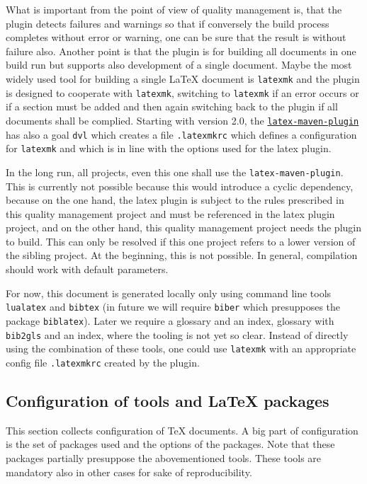 \documentclass[a4paper,12pt]{article}
\begin{document}
What is important from the point of view of quality management is, 
that the plugin detects failures and warnings so 
that if conversely the build process completes without error or warning, 
one can be sure that the result is without failure also. 
Another point is that the plugin is for building all documents in one build run 
but supports also development of a single document. 
Maybe the most widely used tool for building a single \LaTeX{} document 
is \texttt{latexmk} and the plugin is designed to cooperate with \texttt{latexmk}, 
switching to \texttt{latexmk} if an error occurs or if a section must be added 
and then again switching back to the plugin if all documents shall be complied. 
Starting with version 2.0, 
the \href{https://github.com/Reissner/latex-maven-plugin}{\texttt{latex-maven-plugin}} 
has also a goal \texttt{dvl} which creates a file \texttt{.latexmkrc} 
which defines a configuration for \texttt{latexmk} 
and which is in line with the options used for the latex plugin. 



In the long run, 
all projects, even this one shall use the \texttt{latex-maven-plugin}. 
This is currently not possible because this would introduce a cyclic dependency, 
because on the one hand, the latex plugin is subject to the rules 
prescribed in this quality management project 
and must be referenced in the latex plugin project, 
and on the other hand, 
this quality management project needs the plugin to build. 
This can only be resolved if this one project 
refers to a lower version of the sibling project. 
At the beginning, this is not possible. 
In general, compilation should work with default parameters. 

For now, this document is generated locally 
only using command line tools \texttt{lualatex} and \texttt{bibtex} 
(in future we will require \texttt{biber} which presupposes the package \texttt{biblatex}). 
Later we require a glossary and an index, glossary with \texttt{bib2gls} 
and an index, where the tooling is not yet so clear. 
Instead of directly using the combination of these tools, 
one could use \texttt{latexmk} 
with an appropriate config file \texttt{.latexmkrc} created by the plugin. 

\subsection{Configuration of tools and \LaTeX{} packages}\label{subsec:toolConf}

This section collects configuration of \TeX{} documents. 
A big part of configuration is the set of packages used 
and the options of the packages. 
Note that these packages partially presuppose the abovementioned tools. 
These tools are mandatory also in other cases for sake of reproducibility. 
\end{document}
